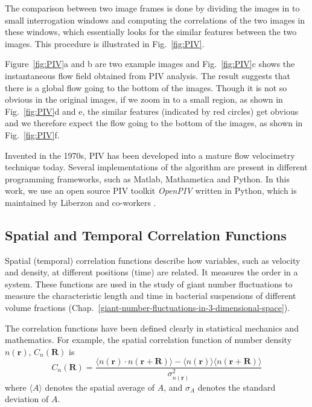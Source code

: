 The comparison between two image frames is done by dividing the images in to small interrogation windows and computing the correlations of the two images in these windows, which essentially looks for the similar features between the two images. This procedure is illustrated in Fig.~\ref{fig:PIV}.

Figure~\ref{fig:PIV}a and b are two example images and Fig.~\ref{fig:PIV}c shows the instantaneous flow field obtained from PIV analysis. The result suggests that there is a global flow going to the bottom of the images. Though it is not so obvious in the original images, if we zoom in to a small region, as shown in Fig.~\ref{fig:PIV}d and e, the similar features (indicated by red circles) get obvious and we therefore expect the flow going to the bottom of the images, as shown in Fig.~\ref{fig:PIV}f.

Invented in the 1970s, PIV has been developed into a mature flow velocimetry technique today. Several implementations of the algorithm are present in different programming frameworks, such as Matlab, Mathametica and Python. In this work, we use an open source PIV toolkit \textit{OpenPIV} written in Python, which is maintained by Liberzon and co-workers \cite{OpenPIV-website, OpenPIV-paper}.

\subsection{Spatial and Temporal Correlation Functions}

Spatial (temporal) correlation functions describe how variables, such as velocity and density, at different positions (time) are related. It measures the order in a system. These functions are used in the study of giant number fluctuations to measure the characteristic length and time in bacterial suspensions of different volume fractions (Chap.~\ref{giant-number-fluctuations-in-3-dimensional-space}).

The correlation functions have been defined clearly in statistical mechanics and mathematics. For example, the spatial correlation function of number density $n(\bm{r})$, $C_n(\bm{R})$ is
\begin{equation}
	\label{eq:correlation-function}
	C_n(\bm{R}) = \frac{\langle n(\bm{r})\cdot n(\bm{r}+\bm{R}) \rangle - \langle n(\bm{r})\rangle \langle n(\bm{r}+\bm{R})\rangle}{\sigma_{n(\bm{r})}^2}
\end{equation}
%
where $\langle A \rangle$ denotes the spatial average of $A$, and $\sigma_A$ denotes the standard deviation of $A$.

